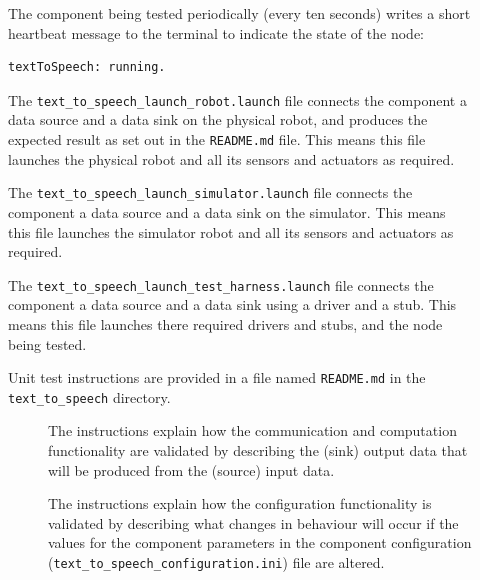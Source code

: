 \documentclass{CSSRforAfrica}
\newcommand{\checkboxChecked}{\fbox{\ding{51}}} %
\newcommand{\checkboxDashed}{\fbox{--}}         %
\begin{document}
\begin{description}
\item[\checkboxChecked] The component being tested periodically (every ten seconds) writes a short heartbeat message to the terminal to indicate the state of the node:
{\small
\begin{verbatim}
textToSpeech: running.
\end{verbatim}
}

\item[\checkboxDashed] The {\small \verb+text_to_speech_launch_robot.launch+} file  connects the component a data source and a data sink on the physical robot, and produces the expected result as set out in the  \small {\texttt{README.md}}   file.    This means this file launches the physical robot and all its sensors and actuators as required.

\item[\checkboxDashed] The {\small \verb+text_to_speech_launch_simulator.launch+} file  connects the component a data source and a data sink on the simulator.    This means this file launches the simulator robot and all its sensors and actuators as required.

\item[\checkboxDashed] The {\small \verb+text_to_speech_launch_test_harness.launch+} file  connects the component a data source and a data sink using a driver and a stub.   This means this file launches there required drivers and stubs, and the node being tested.

\item[\checkboxChecked] Unit test instructions are provided in a file named {\small \verb+README.md+} in the {\small \verb+text_to_speech+} directory.

\begin{description}

\item[\checkboxChecked] The instructions  explain how the  communication and computation functionality are validated by describing the (sink) output data that will be produced from the (source) input data.  

\item[\checkboxChecked] The instructions  explain how the  configuration functionality is validated by describing what changes in behaviour will occur if the values for the component parameters in the component configuration ({\small \verb+text_to_speech_configuration.ini+}) file are altered.

\end{description}

\end{description}
\end{document}
